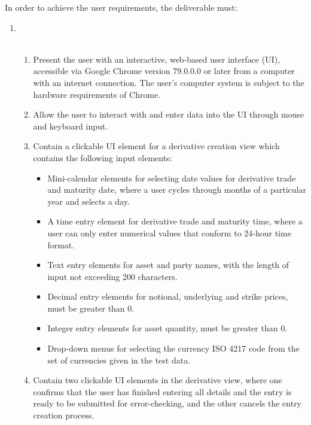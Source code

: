 \documentclass[8pt]{extarticle}
\begin{document}
In order to achieve the user requirements, the deliverable must: 

\begin{enumerate}[label=C\arabic*]
\item \\\
\begin{enumerate}[label=D1.\arabic*]
\item Present the user with an interactive, web-based user interface (UI), accessible via Google Chrome version 79.0.0.0 or later from a computer with an internet connection. The user’s computer system is subject to the hardware requirements of Chrome. 

\item Allow the user to interact with and enter data into the UI through mouse and keyboard input. 

\item Contain a clickable UI element for a derivative creation view which contains the following input elements: 

\begin{itemize}
\item Mini-calendar elements for selecting date values for derivative trade and maturity date, where a user cycles through months of a particular year and selects a day. 

\item A time entry element for derivative trade and maturity time, where a user can only enter numerical values that conform to 24-hour time format. 

\item Text entry elements for asset and party names, with the length of input not exceeding 200 characters. 

\item Decimal entry elements for notional, underlying and strike prices, must be greater than 0.

\item Integer entry elements for asset quantity, must be greater than 0. 

\item Drop-down menus for selecting the currency ISO 4217 code from the set of currencies given in the test data.
\end{itemize}

\item Contain two clickable UI elements in the derivative view, where one confirms that the user has finished entering all details and the entry is ready to be submitted for error-checking, and the other cancels the entry creation process. 
\end{enumerate}
 


\end{enumerate}
\end{document}
